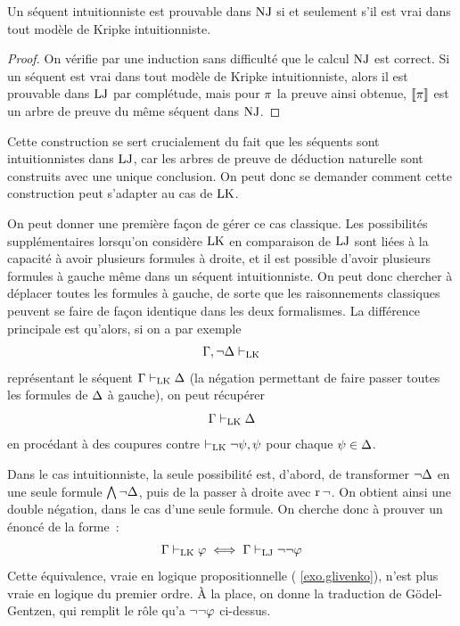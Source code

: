 \begin{table}[p]
  \vspace{0.2cm}
  \caption{Transformation syntaxique de la \cref{def.LJtoNJ}}
  \label{tbl.LJtoNJ}
\end{table}

\begin{corollary}
  Un séquent intuitionniste est prouvable dans $\operatorname{NJ}$ si et seulement s'il est
  vrai dans tout modèle de Kripke intuitionniste.
\end{corollary}

\begin{proof}
  On vérifie par une induction sans difficulté que le calcul $\operatorname{NJ}$ est correct.
  Si un séquent est vrai dans tout modèle de Kripke intuitionniste, alors il
  est prouvable dans $\operatorname{LJ}$ par complétude, mais pour $\pi$ la preuve ainsi
  obtenue, $\llbracket \pi \rrbracket$ est un arbre de preuve du même séquent dans $\operatorname{NJ}$.
\end{proof}

Cette construction se sert crucialement du fait que les séquents sont
intuitionnistes dans $\operatorname{LJ}$, car les arbres de preuve de déduction naturelle
sont construits avec une unique conclusion. On peut donc se demander comment
cette construction peut s'adapter au cas de $\operatorname{LK}$.

On peut donner une première façon de gérer ce cas classique. Les possibilités
supplémentaires lorsqu'on considère $\operatorname{LK}$ en comparaison de $\operatorname{LJ}$ sont liées à
la capacité à avoir plusieurs formules à droite, et il est possible d'avoir
plusieurs formules à gauche même dans un séquent intuitionniste. On peut donc
chercher à déplacer toutes les formules à gauche, de sorte que les raisonnements
classiques peuvent se faire de façon identique dans les deux formalismes. La
différence principale est qu'alors, si on a par exemple
\[\Gamma,\lnot\Delta\vdash_{\operatorname{LK}}\]
représentant le séquent $\Gamma\vdash_{\operatorname{LK}}\Delta$ (la négation permettant de faire
passer toutes les formules de $\Delta$ à gauche), on peut récupérer
\[\Gamma\vdash_{\operatorname{LK}}\Delta\]
en procédant à des coupures contre $\vdash_{\operatorname{LK}}\lnot\psi,\psi$ pour chaque
$\psi \in \Delta$.

Dans le cas intuitionniste, la seule possibilité est, d'abord, de transformer
$\lnot\Delta$ en une seule formule $\bigwedge\lnot\Delta$, puis de la passer à
droite avec $\operatorname{r}\mathord{\lnot}$. On obtient ainsi une double négation, dans le cas d'une
seule formule. On cherche donc à prouver un énoncé de la forme~:
\[\Gamma\vdash_{\operatorname{LK}}\varphi \iff \Gamma\vdash_{\operatorname{LJ}}\lnot\lnot\varphi\]
Cette équivalence, vraie en logique propositionnelle (
\cref{exo.glivenko}), n'est plus vraie en logique du premier ordre. \`A la
place, on donne la traduction de Gödel-Gentzen, qui remplit le rôle qu'a
$\lnot\lnot\varphi$ ci-dessus.

